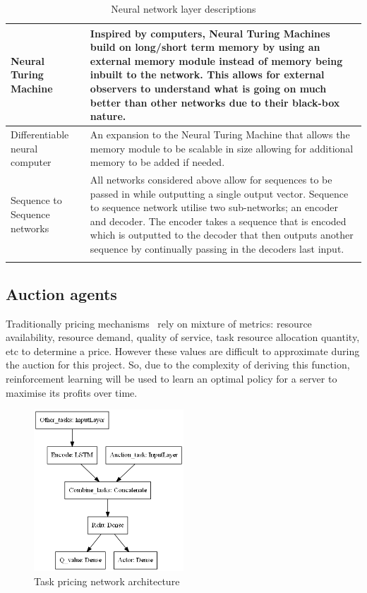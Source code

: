 \begin{longtable}{|p{3.5cm}|p{12cm}|}
    Neural Turing Machine~\citep{NTM} & Inspired by computers, Neural Turing Machines build on long/short term memory
        by using an external memory module instead of memory being inbuilt to the network. This allows for external
        observers to understand what is going on much better than other networks due to their black-box nature. \\ \hline

    Differentiable neural computer~\citep{DNC} & An expansion to the Neural Turing Machine that allows the memory
        module to be scalable in size allowing for additional memory to be added if needed. \\ \hline

    Sequence to Sequence networks~\citep{seq2seq} & All networks considered above allow for sequences to be passed in
        while outputting a single output vector. Sequence to sequence network utilise two sub-networks; an encoder and
        decoder. The encoder takes a sequence that is encoded which is outputted to the decoder that then outputs
        another sequence by continually passing in the decoders last input. \\ \hline
    \caption{Neural network layer descriptions}
    \label{tab:neural_network_layers}
\end{longtable}

\subsection{Auction agents}
\label{subsec:auction-agents}
Traditionally pricing mechanisms~\citep{al2013cloud} rely on mixture of metrics: resource availability, resource demand,
quality of service, task resource allocation quantity, etc to determine a price. However
these values are difficult to approximate during the auction for this project. So, due to the complexity of
deriving this function, reinforcement learning will be used to learn an optimal policy for a server to maximise its
profits over time.

\begin{figure}[H]
    \centering
    \includegraphics[width=0.5\textwidth]{figures/3_solution_figs/task_pricing_network_architecture.png}
    \caption{Task pricing network architecture}
    \label{fig:task_pricing_network_architecture}
\end{figure}

